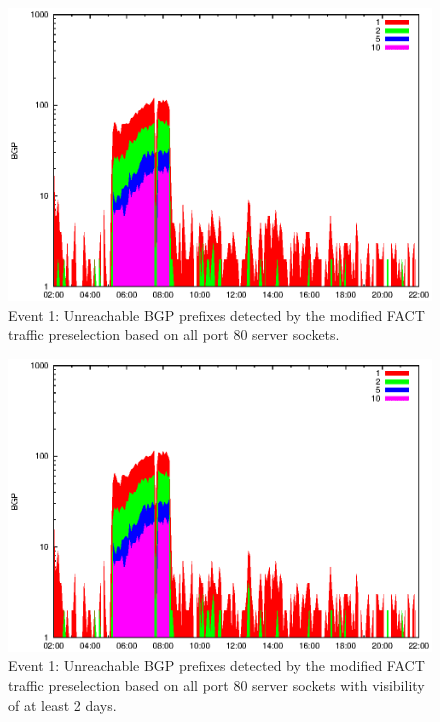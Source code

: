 \begin{figure}
	[p] \centering 
	\includegraphics[width=0.75\linewidth]{images/events/2010_03_25/bgp_log_allPort80SES.eps}
	\caption{Event 1: Unreachable BGP prefixes detected by the modified FACT traffic preselection based on all port 80 server sockets.} 
	\label{fig:AMS_IX_FACT_allSES80} 
\end{figure}


\begin{figure}
	[p] \centering 
	\includegraphics[width=0.75\linewidth]{images/events/2010_03_25/bgp_log_port80_Set_stab_0_vts_2.eps}
	\caption{Event 1: Unreachable BGP prefixes detected by the modified FACT traffic preselection based on all port 80 server sockets with visibility of at least 2 days.} 
	\label{fig:AMS_IX_FACT_allSES80VTS2} 
\end{figure}

